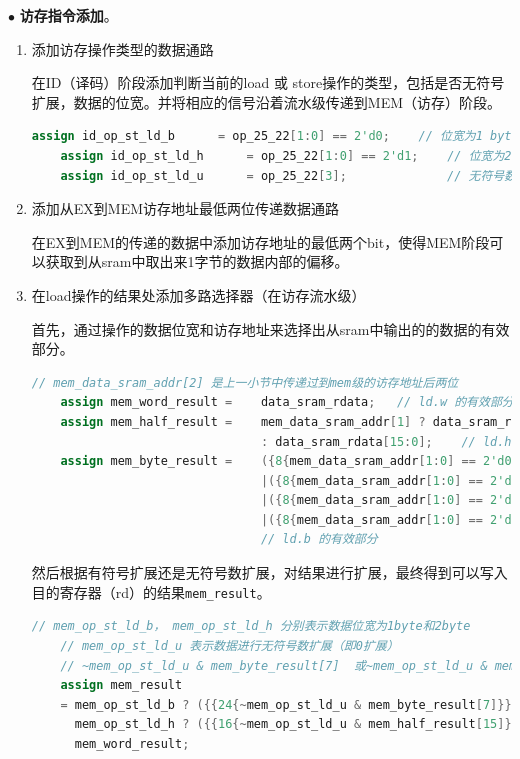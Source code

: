 \documentclass[11pt]{article}
\begin{document}
\noindent
$\bullet$
\textbf{访存指令添加}。
\begin{enumerate}
  \item 添加访存操作类型的数据通路
  
  在ID（译码）阶段添加判断当前的load 或 store操作的类型，包括是否无符号扩展，数据的位宽。并将相应的信号沿着流水级传递到MEM（访存）阶段。

  \begin{lstlisting}[language=verilog]
    assign id_op_st_ld_b      = op_25_22[1:0] == 2'd0;    // 位宽为1 byte
    assign id_op_st_ld_h      = op_25_22[1:0] == 2'd1;    // 位宽为2 byte
    assign id_op_st_ld_u      = op_25_22[3];              // 无符号数扩展
  \end{lstlisting}
\item 添加从EX到MEM访存地址最低两位传递数据通路

  在EX到MEM的传递的数据中添加访存地址的最低两个bit，使得MEM阶段可以获取到从sram中取出来1字节的数据内部的偏移。

  \item 在load操作的结果处添加多路选择器（在访存流水级）
  
  首先，通过操作的数据位宽和访存地址来选择出从sram中输出的的数据的有效部分。
  \begin{lstlisting}[language=verilog]
    // mem_data_sram_addr[2] 是上一小节中传递过到mem级的访存地址后两位
    assign mem_word_result =    data_sram_rdata;   // ld.w 的有效部分
    assign mem_half_result =    mem_data_sram_addr[1] ? data_sram_rdata[31:16]
                                : data_sram_rdata[15:0];    // ld.h 的有效部分
    assign mem_byte_result =    ({8{mem_data_sram_addr[1:0] == 2'd0}} & data_sram_rdata[7:0])
                                |({8{mem_data_sram_addr[1:0] == 2'd1}} & data_sram_rdata[15:8])
                                |({8{mem_data_sram_addr[1:0] == 2'd2}} & data_sram_rdata[23:16])
                                |({8{mem_data_sram_addr[1:0] == 2'd3}} & data_sram_rdata[31:24]);
                                // ld.b 的有效部分

  \end{lstlisting}

  然后根据有符号扩展还是无符号数扩展，对结果进行扩展，最终得到可以写入目的寄存器（rd）的结果\verb|mem_result|。
  \begin{lstlisting}[language=verilog]
    // mem_op_st_ld_b， mem_op_st_ld_h 分别表示数据位宽为1byte和2byte
    // mem_op_st_ld_u 表示数据进行无符号数扩展（即0扩展）
    // ~mem_op_st_ld_u & mem_byte_result[7]  或~mem_op_st_ld_u & mem_half_result[15] 表示符号位
    assign mem_result 
    = mem_op_st_ld_b ? ({{24{~mem_op_st_ld_u & mem_byte_result[7]}}, mem_byte_result[7:0]}):       
      mem_op_st_ld_h ? ({{16{~mem_op_st_ld_u & mem_half_result[15]}}, mem_half_result[15:0]}) :
      mem_word_result;
  \end{lstlisting}


\end{enumerate}
\end{document}
